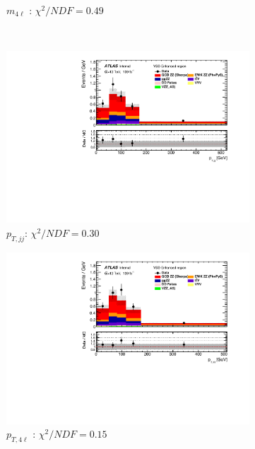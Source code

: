 \begin{figure}[!htb]
\begin{subfigure}{.49\textwidth}
        \caption{ \footnotesize{$m_{4\ell}$ }: $\chi^2/NDF = 0.49$ }
    \end{subfigure}\\
    \begin{subfigure}{.49\textwidth}
        \centering
        \includegraphics[width=.98\linewidth]{figures/Results/RecoDist_VBSEnhanced/reco_ptjj_SR.pdf}
        \caption{ \footnotesize{$p_{T,jj}$}: $\chi^2/NDF = 0.30$ }
    \end{subfigure}
    \begin{subfigure}{.49\textwidth}
        \centering
        \includegraphics[width=.98\linewidth]{figures/Results/RecoDist_VBSEnhanced/reco_pt4l_SR.pdf}
        \caption{ \footnotesize{$p_{T,4\ell}$ }: $\chi^2/NDF = 0.15$ }
    \end{subfigure}\\
    \begin{subfigure}{.49\textwidth}

\end{subfigure}
\end{figure}
